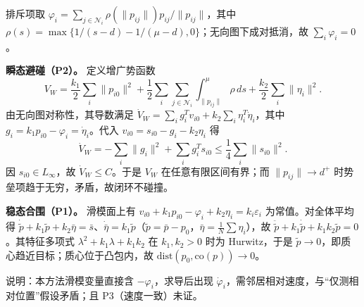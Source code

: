 排斥项取 $\varphi_i=\sum_{j\in\mathcal N_i}\rho(\|p_{ij}\|)p_{ij}/\|p_{ij}\|$，其中 $\rho(s)=\max\{1/(s-d)-1/(\mu-d),0\}$；无向图下成对抵消，故 $\sum_i\varphi_i=0$。

\textbf{瞬态避碰（P2）。} 定义增广势函数
\[
    V_W=\frac{k_1}{2}\sum_i\|p_{i0}\|^2
    +\frac12\sum_i\sum_{j\in\mathcal N_i}\int_{\|p_{ij}\|}^{\mu}\rho\,ds
    +\frac{k_2}{2}\sum_i\|\eta_i\|^2 .
\]
由无向图对称性，其导数满足 $\dot V_W=\sum_i g_i^Tv_{i0}+k_2\sum_i\eta_i^T\dot\eta_i$，其中 $g_i=k_1p_{i0}-\varphi_i=\dot\eta_i$。代入 $v_{i0}=s_{i0}-g_i-k_2\eta_i$ 得
\[
    \dot V_W=-\sum_i\|g_i\|^2+\sum_i g_i^Ts_{i0}
    \le\frac14\sum_i\|s_{i0}\|^2 .
\]
因 $s_{i0}\in L_\infty$，故 $\dot V_W\le C$。于是 $V_W$ 在任意有限区间有界；而 $\|p_{ij}\|\to d^+$ 时势垒项趋于无穷，矛盾，故闭环不碰撞。

\textbf{稳态合围（P1）。} 滑模面上有 $v_{i0}+k_1p_{i0}-\varphi_i+k_2\eta_i=k_i\varepsilon_i$ 为常值。对全体平均得 $\dot{\tilde p}+k_1\tilde p+k_2\bar\eta=\bar s$、$\dot{\bar\eta}=k_1\tilde p$（$\tilde p=\bar p-p_0$，$\bar\eta=\frac1N\sum\eta_i$），故 $\ddot{\tilde p}+k_1\dot{\tilde p}+k_1k_2\tilde p=0$。其特征多项式 $\lambda^2+k_1\lambda+k_1k_2$ 在 $k_1,k_2>0$ 时为 Hurwitz，于是 $\tilde p\to0$，即质心趋近目标；质心位于凸包内，故 $\mathrm{dist}(p_0,\mathrm{co}(p))\to0$。

说明：本方法滑模变量直接含 $-\varphi_i$，求导后出现 $\dot\varphi_i$，需邻居相对速度，与“仅测相对位置”假设矛盾；且 P3（速度一致）未证。
